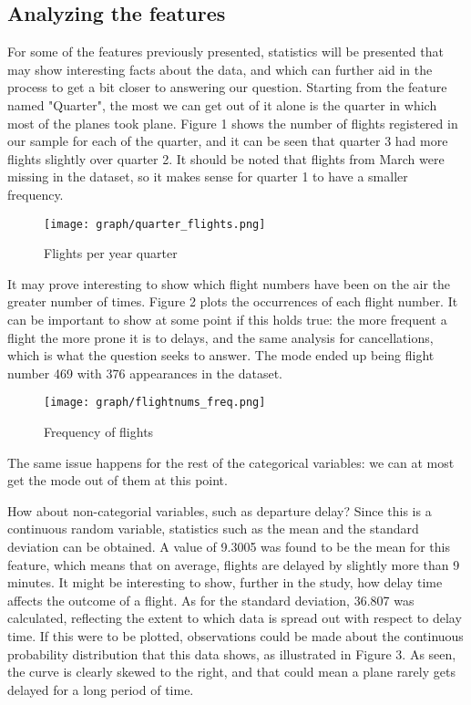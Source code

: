\documentclass{article}
\begin{document}
	\subsection{Analyzing the features}
	For some of the features previously presented, statistics will be presented that may show interesting
	facts about the data, and which can further aid in the process to get a bit closer to answering our question.\newline
	\indent Starting from the feature named "Quarter", the most we can get out of it alone is the quarter in which most of the planes
	took plane. Figure 1 shows the number of flights registered in our sample for each of the quarter, and it can be seen
	that quarter 3 had more flights slightly over quarter 2. It should be noted that flights from March were missing in the dataset, so it makes sense for quarter 1 to have a smaller frequency.

	\begin{figure}[H]
      \texttt{[image: graph/quarter\_flights.png]}
      \caption{Flights per year quarter}
      \label{fig:graph1}
    \end{figure}\newline

	It may prove interesting to show which flight numbers have been on the air the greater number of times. Figure 2 plots the
	occurrences of each flight number. It can be important to show
	at some point if this holds true: the more frequent a flight the more prone it is to delays, and the same analysis for cancellations, which is what the question seeks
	to answer. The mode ended up being flight number 469 with 376 appearances in the dataset.

	\begin{figure}[H]
	  \texttt{[image: graph/flightnums\_freq.png]}
	  \caption{Frequency of flights}
	  \label{fig:graph1}
	\end{figure}\newline


	The same issue happens for the rest of the categorical variables: we can at most get the mode out of them at this point.

	How about non-categorial variables, such as departure delay? Since this is a continuous random variable, statistics such as the mean and the standard deviation
	can be obtained. A value of 9.3005 was found to be the mean for this feature, which means that on average, flights are delayed
	by slightly more than 9 minutes. It might be interesting to show, further in the study, how delay time affects the outcome of
	a flight. As for the standard deviation, 36.807 was calculated, reflecting the extent to which data is spread out with respect
	to delay time. If this were to be plotted, observations could be made about the continuous probability distribution that this data shows, as illustrated in Figure 3. As seen, the curve is clearly skewed to the right, and that could mean a plane rarely gets
	delayed for a long period of time.
\end{document}
